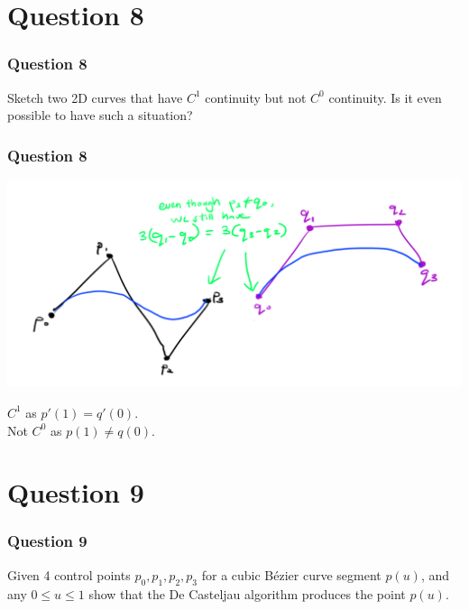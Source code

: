 \documentclass{beamer}
\begin{document}
\section{Question 8}

\begin{frame}
    \frametitle{Question 8}
    Sketch two 2D curves that have $C^1$ continuity but not $C^0$ continuity. Is it even possible to have such a situation?
\end{frame}

\begin{frame}
    \frametitle{Question 8}

    \centering
    \includegraphics[scale=0.4]{q8.png}
    \vspace{1em}

    $C^1$ as $p'(1) = q'(0)$.\\
    Not $C^0$ as $p(1) \neq q(0)$.

\end{frame}

\section{Question 9}

\begin{frame}
    \frametitle{Question 9}
    Given 4 control points $p_0, p_1, p_2, p_3$ for a cubic Bézier curve segment $p(u)$, and any $0 \le u \le 1$
    show that the De Casteljau algorithm produces the point $p(u)$.
\end{frame}
\end{document}

